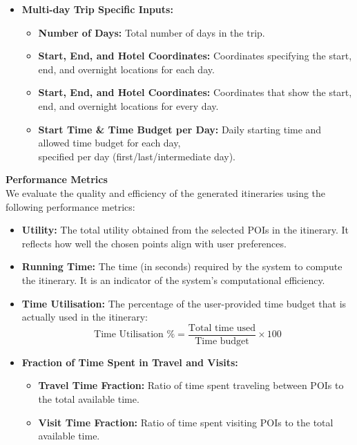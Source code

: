 \begin{itemize}
    \item \textbf{Multi-day Trip Specific Inputs:}
    \begin{itemize}
        \item \textbf{Number of Days:} Total number of days in the trip.
        \item \textbf{Start, End, and Hotel Coordinates:} Coordinates specifying the start, end, and overnight locations for each day.
        \item \textbf{Start, End, and Hotel Coordinates:} Coordinates that show the start, end, and overnight locations for every day.
        \item \textbf{Start Time \& Time Budget per Day:} Daily starting time and allowed time budget for each day, \\specified per day (first/last/intermediate day).
    \end{itemize}
\end{itemize}
\vspace{0.5cm}
\noindent\textbf{Performance Metrics}\\
We evaluate the quality and efficiency of the generated itineraries using the following performance metrics:

\begin{itemize}
    \item \textbf{Utility:} The total utility obtained from the selected POIs in the itinerary. It reflects how well the chosen points align with user preferences.
    
    \item \textbf{Running Time:} The time (in seconds) required by the system to compute the itinerary. It is an indicator of the system's computational efficiency.
    
    \item \textbf{Time Utilisation:} The percentage of the user-provided time budget that is actually used in the itinerary:
    \[
    \text{Time Utilisation \%} = \frac{\text{Total time used}}{\text{Time budget}} \times 100
    \]
    
    \item \textbf{Fraction of Time Spent in Travel and Visits:}
    \begin{itemize}
        \item \textbf{Travel Time Fraction:} Ratio of time spent traveling between POIs to the total available time.
        \item \textbf{Visit Time Fraction:} Ratio of time spent visiting POIs to the total available time.
    \end{itemize}
\end{itemize}


